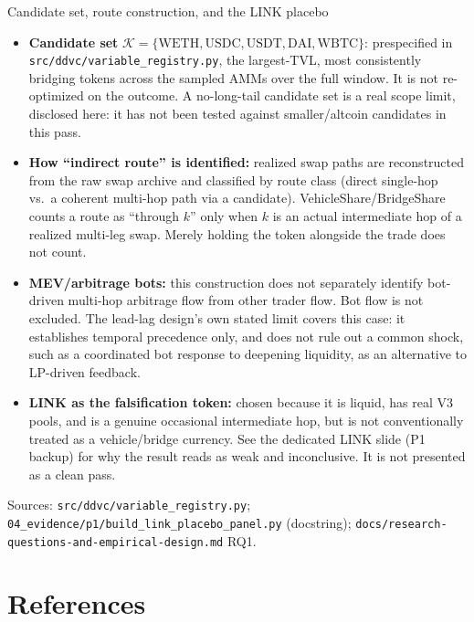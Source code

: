 \documentclass[aspectratio=169]{beamer}
\begin{document}
\begin{frame}{Candidate set, route construction, and the LINK placebo}
  \scriptsize
  \begin{itemize}
    \item \textbf{Candidate set} $\mathcal K=\{\mathrm{WETH},\mathrm{USDC},\mathrm{USDT},\mathrm{DAI},\mathrm{WBTC}\}$: prespecified in \texttt{src/ddvc/variable\_registry.py}, the largest-TVL, most consistently bridging tokens across the sampled AMMs over the full window. It is not re-optimized on the outcome. A no-long-tail candidate set is a real scope limit, disclosed here: it has not been tested against smaller/altcoin candidates in this pass.
    \item \textbf{How ``indirect route'' is identified:} realized swap paths are reconstructed from the raw swap archive and classified by route class (direct single-hop vs.\ a coherent multi-hop path via a candidate). VehicleShare/BridgeShare counts a route as ``through $k$'' only when $k$ is an actual intermediate hop of a realized multi-leg swap. Merely holding the token alongside the trade does not count.
    \item \textbf{MEV/arbitrage bots:} this construction does not separately identify bot-driven multi-hop arbitrage flow from other trader flow. Bot flow is not excluded. The lead-lag design's own stated limit covers this case: it establishes temporal precedence only, and does not rule out a common shock, such as a coordinated bot response to deepening liquidity, as an alternative to LP-driven feedback.
    \item \textbf{LINK as the falsification token:} chosen because it is liquid, has real V3 pools, and is a genuine occasional intermediate hop, but is not conventionally treated as a vehicle/bridge currency. See the dedicated LINK slide (P1 backup) for why the result reads as weak and inconclusive. It is not presented as a clean pass.
  \end{itemize}
  {\scriptsize Sources: \texttt{src/ddvc/variable\_registry.py}; \texttt{04\_evidence/p1/build\_link\_placebo\_panel.py} (docstring); \texttt{docs/research-questions-and-empirical-design.md} RQ1.}
\end{frame}

\section{References}
\end{document}
